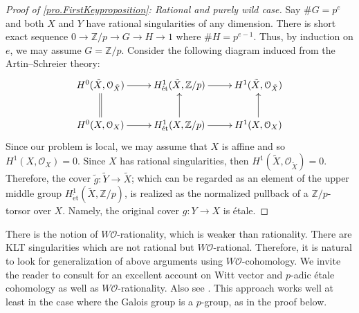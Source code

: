 \documentclass[12pt]{amsart}
\theoremstyle{plain}   %
\theoremstyle{definition}    %
\theoremstyle{remark}    %
\numberwithin{equation}{theorem}
\newcommand{\sO}{\mathcal{O}}
\newcommand{\bZ}{\mathbb{Z}}
\begin{document}
\begin{proof}[Proof of \autoref{pro.FirstKeyproposition}: Rational and purely wild case]
Say $\#G = p^e$ and both $X$ and $Y$ have rational singularities of any dimension. There is short exact sequence $0 \to \bZ/p \to G \to H \to 1$ where $\# H = p^{e-1}$. Thus, by induction on $e$, we may assume $G=\bZ/p$. Consider the following diagram induced from the Artin--Schreier theory:
\[
\xymatrix{
H^0(\tilde X, \mathcal{O}_{\tilde X}) \ar[r] & H^1_{\mathrm{\acute{e}t}}(\tilde X, \bZ/p) \ar[r] & H^1(\tilde X, \mathcal{O}_{\tilde{X}}) \\
H^0( X, \mathcal{O}_X) \ar[r]\ar@{=}[u] & H^1_{\mathrm{\acute{e}t}}( X, \bZ/p) \ar[r]\ar[u] & H^1( X, \mathcal{O}_X)\ar[u]
}
\]
Since our problem is local, we may assume that $X$ is affine and so $H^1(X,\sO_X)=0$. Since $X$ has rational singularities, then $H^1(\tilde X, \mathcal{O}_{\tilde{X}}) = 0$. Therefore, the cover $\tilde{g}\colon\tilde Y \to \tilde X$; which can be regarded as an element of the upper middle group $H^1_{\mathrm{\acute{e}t}}(\tilde X, \bZ/p)$, is realized as the normalized pullback of a $\bZ/p$-torsor over $X$. Namely, the original cover $g\colon Y\to X$ is \'etale.
\end{proof}


There is the notion of $W\sO$-rationality, which is weaker than rationality. There are KLT singularities which are not rational but $W\sO$-rational. Therefore, it is natural to look for generalization of above arguments using $W\sO$-cohomology. 
We invite the reader to consult \cite[\S 3]{PatakfalviZdanowiczOrdinaryVarietiesTrivialCanoniucalNOtUniruled} for an excellent account on Witt vector and $p$-adic \'etale cohomology as well as $W\sO$-rationality. Also see \cite{GongyoNakamuraTanakaRationalPointsFanoThreefoldsFiniteFields,ChatzistamatiouRullingHodgeWittCohomologyWittRationalSingularities,BerthelotBlochEsnaultWittVectorCohomologySingularVarieties,Chambert-LoirPointsRationnels,LeStumRigidCohomology}. This approach works well at least in the case where the Galois group is a $p$-group, as in the proof below.
\end{document}
